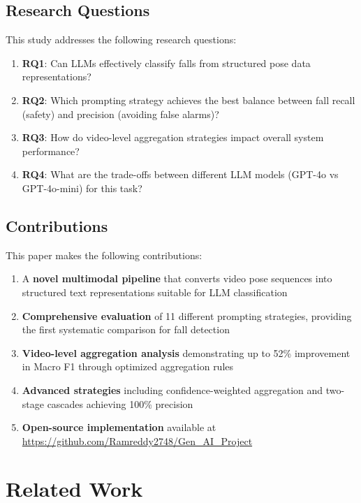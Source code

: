 \documentclass[conference]{IEEEtran}
\begin{document}
\subsection{Research Questions}

This study addresses the following research questions:
\begin{enumerate}[leftmargin=*]
    \item \textbf{RQ1}: Can LLMs effectively classify falls from structured pose data representations?
    \item \textbf{RQ2}: Which prompting strategy achieves the best balance between fall recall (safety) and precision (avoiding false alarms)?
    \item \textbf{RQ3}: How do video-level aggregation strategies impact overall system performance?
    \item \textbf{RQ4}: What are the trade-offs between different LLM models (GPT-4o vs GPT-4o-mini) for this task?
\end{enumerate}

\subsection{Contributions}

This paper makes the following contributions:
\begin{enumerate}[leftmargin=*]
    \item A \textbf{novel multimodal pipeline} that converts video pose sequences into structured text representations suitable for LLM classification
    \item \textbf{Comprehensive evaluation} of 11 different prompting strategies, providing the first systematic comparison for fall detection
    \item \textbf{Video-level aggregation analysis} demonstrating up to 52\% improvement in Macro F1 through optimized aggregation rules
    \item \textbf{Advanced strategies} including confidence-weighted aggregation and two-stage cascades achieving 100\% precision
    \item \textbf{Open-source implementation} available at \url{https://github.com/Ramreddy2748/Gen_AI_Project}
\end{enumerate}

\section{Related Work}
\end{document}
